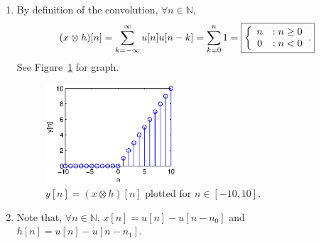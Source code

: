 \documentclass[11pt]{article}
\newcommand{\N}{\mathbb{N}} %
\begin{document}
\begin{enumerate}
\item By definition of the convolution, $\forall n \in \N$,
\[
(x \otimes h)[n]
 = \sum_{k = -\infty}^{\infty} u[n]u[n - k]
 = \sum_{k = 0}^n 1
 = \mbox{\fbox{$\displaystyle
        \left\{
            \begin{array}{cl}
                n & : n \geq 0 \\
                0 & : n < 0
            \end{array}
        \right.
$.}}
\]
See Figure~\ref{fig:2.3} for graph.
\begin{figure}[h]
\begin{center}
\includegraphics[width=0.46\textwidth]{2.3.eps}
\end{center}
\caption{$y[n] = (x \otimes h)[n]$ plotted for $n \in [-10,10]$.}
\label{fig:2.3}
\end{figure}
 
\item Note that, $\forall n \in \N$, $x[n] = u[n] - u[n - n_0]$ and
$h[n] = u[n] - u[n - n_1]$.


\end{enumerate}
\end{document}

